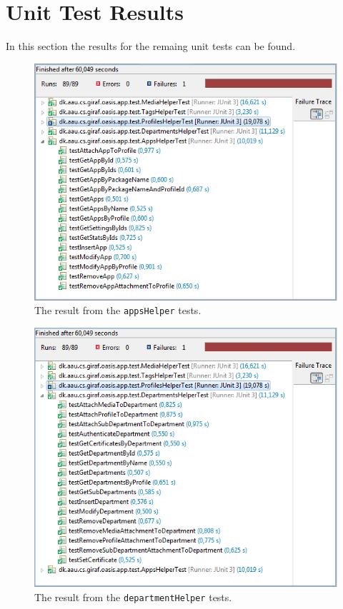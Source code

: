 \section{Unit Test Results}
\label{app:unitTestResults}
In this section the results for the remaing unit tests can be found.

\begin{figure}[h]
	\centering
		\includegraphics[width=\textwidth]{Images/unit_testing/app_helper_tests.PNG}
	\caption{The result from the \texttt{appsHelper} tests.}
	\label{fig:app_helper_tests}
\end{figure}

\begin{figure}[h]
	\centering
		\includegraphics[width=\textwidth]{Images/unit_testing/department_helper_tests.PNG}
	\caption{The result from the \texttt{departmentHelper} tests.}
	\label{fig:department_helper_tests}
\end{figure}

